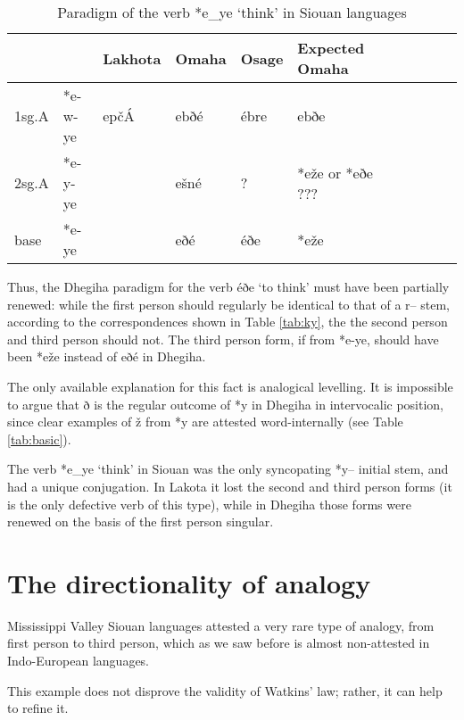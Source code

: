 \documentclass[oldfontcommands,oneside,a4paper,11pt]{article}
\newcommand{\ipa}[1]{{\phon#1}} %
\newcommand{\grise}[1]{\cellcolor{lightgray}\textbf{#1}}
\begin{document}
 \begin{table}[h]
\caption{Paradigm of the verb *\ipa{e\_ye} `think' in Siouan languages}  \label{tab:think} \centering
\begin{tabular}{ll|l|ll|llll|ll}
\toprule
 &	 &	Lakhota &	 	Omaha &	Osage 	& Expected Omaha\\	
 \midrule
1sg.A &	*\ipa{e-w-ye} &	 \ipa{epčÁ} &   \ipa{ebðé} &\ipa{ébre} &\ipa{ebðe}\\
2sg.A &*\ipa{e-y-ye}&  &  \ipa{ešné} &? &*\ipa{eže} or *\ipa{eðe} ??? \grise{}& \\
base &	*\ipa{e-ye} &	  &\ipa{eðé} &\ipa{éðe} & *\ipa{eže}\grise{}\\
\bottomrule			
\end{tabular}
\end{table} 

 Thus, the Dhegiha paradigm for the verb \ipa{éðe} `to think' must have been partially renewed: while the first person should regularly be identical to that of a \ipa{r--} stem, according to the correspondences shown in Table \ref{tab:ky}, the the second person and third person should not. The third person form, if from *\ipa{e-ye}, should have been *\ipa{eže} instead of \ipa{eðé} in Dhegiha.

The only available explanation for this fact is analogical levelling. It is impossible to argue that \ipa{ð} is the regular outcome of *\ipa{y} in Dhegiha in intervocalic position, since clear examples of \ipa{ž} from *\ipa{y} are attested word-internally (see Table \ref{tab:basic}).

The verb *\ipa{e\_ye} `think' in Siouan was the only syncopating *\ipa{y--} initial stem, and had a unique conjugation. In Lakota it lost the second and third person forms (it is the only defective verb of this type), while in Dhegiha those forms were renewed on the basis of the first person singular.


\section{The directionality of analogy}

Mississippi Valley Siouan languages attested a very rare type of analogy, from first person to third person, which as we saw before is almost non-attested in Indo-European languages.

This example does not disprove the validity of Watkins' law; rather, it can help to refine it. 
\end{document}
